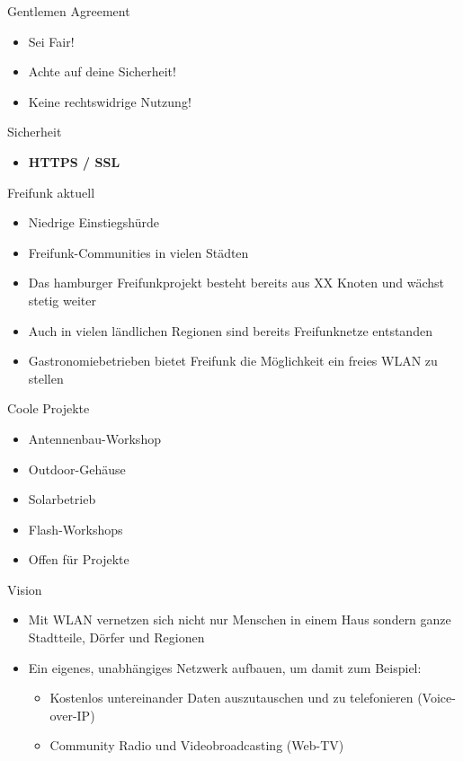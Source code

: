 \documentclass[c]{beamer}
\begin{document}
\begin{frame}{Gentlemen Agreement}
	\begin{itemize}
		\item Sei Fair!
		\item Achte auf deine Sicherheit!
		\item Keine rechtswidrige Nutzung!
	\end{itemize}
\end{frame}

\begin{frame}{Sicherheit}
	\begin{itemize}
		\item \textbf{HTTPS / SSL}
	\end{itemize}
\end{frame}

\begin{frame}{Freifunk aktuell}
	\begin{itemize}
		\item Niedrige Einstiegshürde
		\item Freifunk-Communities in vielen Städten
		\item Das hamburger Freifunkprojekt besteht bereits aus XX Knoten und wächst stetig weiter
		\item Auch in vielen ländlichen Regionen sind bereits Freifunknetze entstanden
		\item Gastronomiebetrieben bietet Freifunk die Möglichkeit ein freies WLAN zu stellen
	\end{itemize}
\end{frame}

\begin{frame}{Coole Projekte}
	\begin{itemize}
		\item Antennenbau-Workshop
		\item Outdoor-Gehäuse
		\item Solarbetrieb
		\item Flash-Workshops
		\item Offen für Projekte
	\end{itemize}
\end{frame}

\begin{frame}{Vision}
	\begin{itemize}
		\item Mit WLAN vernetzen sich nicht nur Menschen in einem Haus sondern ganze Stadtteile, Dörfer und Regionen %
		\item Ein eigenes, unabhängiges Netzwerk aufbauen, um damit zum Beispiel:
		\begin{itemize}
			\item Kostenlos untereinander Daten auszutauschen und zu telefonieren (Voice-over-IP)
			\item Community Radio und Videobroadcasting (Web-TV)
		\end{itemize}
	\end{itemize}
\end{frame}
\end{document}
